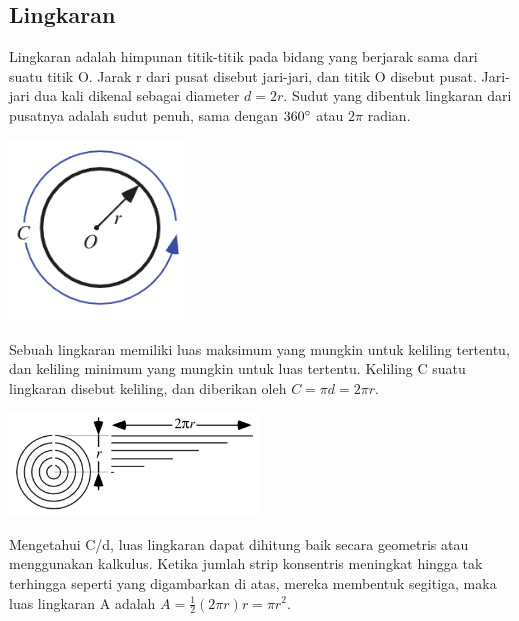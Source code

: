 \subsection{Lingkaran}
Lingkaran adalah himpunan titik-titik pada bidang yang berjarak sama dari suatu titik O. Jarak r dari pusat disebut jari-jari, dan titik O disebut pusat. Jari-jari dua kali dikenal sebagai diameter $d = 2r$. Sudut yang dibentuk lingkaran dari pusatnya adalah sudut penuh, sama dengan $360\degree$ atau $2\pi$ radian.\citep{Circlefr27:online}
\begin{center}
	\includegraphics[width=0.35\textwidth]{gambar/lingkaranpustaka.png}
\end{center}
Sebuah lingkaran memiliki luas maksimum yang mungkin untuk keliling tertentu, dan keliling minimum yang mungkin untuk luas tertentu. Keliling C suatu lingkaran disebut keliling, dan diberikan oleh $C = \pi d = 2\pi r$.\citep{Circlefr27:online}
\begin{center}
	\includegraphics[width=0.50\textwidth]{gambar/luaslingkaranpustaka.png}
\end{center}
Mengetahui C/d, luas lingkaran dapat dihitung baik secara geometris atau menggunakan kalkulus. Ketika jumlah strip konsentris meningkat hingga tak terhingga seperti yang digambarkan di atas, mereka membentuk segitiga, maka luas lingkaran A adalah $A = \frac{1}{2} (2\pi r)r = \pi r^2$.\citep{Circlefr27:online}

